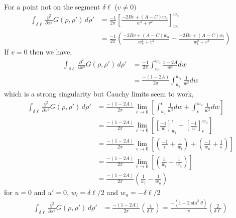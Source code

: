 \documentclass{article}
\newcommand{\0}{\varnothing}
\begin{document}
For a point not on the segment $\delta \ell$ ($v \neq 0)$
\begin{align*}
     \int_{\delta\ell}\frac{\partial^2}{\partial x^2}G(\rho,\rho')\, d\rho' &= 
      \frac{-1}{2\pi} \left[\frac{-2Bv + (A-C) w_u }{w^2+v^2} \right]_{w_l}^{w_u}\\
      &= \frac{-1}{2\pi} \left( \frac{-2Bv + (A-C) w_u }{w_u^2+v^2} -  \frac{-2Bv + (A-C) w_l }{w_l^2+v^2}\right)
\end{align*}If $v =0$ then we have,
\begin{align*}
    \int_{\delta\ell}\frac{\partial^2}{\partial x^2}G(\rho,\rho')\, d\rho' &= \frac{-1}{2\pi} \int_{w_l}^{w_u}
    \frac{1-2A}{w^2} dw \\
     &= \frac{-(1-2A)}{2\pi} \int_{w_l}^{w_u}    \frac{1}{w^2} dw 
\end{align*}which is a strong singularity but Cauchy limits seem to work,
\begin{align*}
 \int_{\delta\ell}\frac{\partial^2}{\partial x^2}G(\rho,\rho')\, d\rho' &=
 \frac{-(1-2A)}{2\pi} \lim_{\epsilon \to 0}\left[ \int_{w_l}^{\epsilon}   \frac{1}{w^2} dw +  \int_{\epsilon}^{w_u}    \frac{1}{w^2} dw \right] \\
 &= \frac{-(1-2A)}{2\pi} \lim_{\epsilon \to 0}\left[ \left[ \frac{-1}{w} \right]_{w_l}^{\epsilon}  +  \left[ \frac{-1}{w} \right]_{\epsilon}^{w_u} \right]\\
  &= \frac{-(1-2A)}{2\pi} \lim_{\epsilon \to 0}\left[ \left( \frac{-1}{\epsilon} + \frac{1}{w_l} \right)
  +  \left( \frac{-1}{w_u}  + \frac{1}{\epsilon} \right) \right] \\
  &= \frac{-(1-2A)}{2\pi} \lim_{\epsilon \to 0}\left[ \left( \frac{1}{w_l}-\frac{1}{w_u} \right) \right]\\
   &= \frac{-(1-2A)}{2\pi} \left( \frac{1}{w_l}-\frac{1}{w_u} \right)
\end{align*}
for $u = 0$ and $u'= 0$, $w_l = \delta \ell/2$ and $w_u = - \delta \ell/2$
\begin{align*}
    \int_{\delta\ell}\frac{\partial^2}{\partial x^2}G(\rho,\rho')\, d\rho' &= \frac{-(1-2A)}{2\pi} \left( \frac{4}{\delta \ell} \right)  = \frac{-(1-2 \sin^2{\theta})}{\pi} \left( \frac{2}{\delta \ell} \right)
\end{align*}

\end{document}
